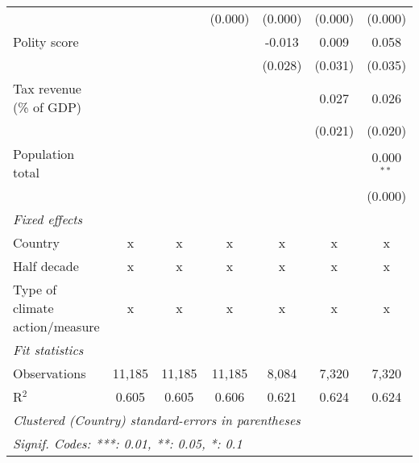 \begin{tabular}{lcccccc}
                                                                                                 &         &               & (0.000)        & (0.000)        & (0.000)        & (0.000)\\   
   Polity score                                                                                  &         &               &                & -0.013         & 0.009          & 0.058\\   
                                                                                                 &         &               &                & (0.028)        & (0.031)        & (0.035)\\   
   Tax revenue (\% of GDP)                                                                       &         &               &                &                & 0.027          & 0.026\\   
                                                                                                 &         &               &                &                & (0.021)        & (0.020)\\   
   Population total                                                                              &         &               &                &                &                & 0.000$^{**}$\\   
                                                                                                 &         &               &                &                &                & (0.000)\\   
   \emph{Fixed effects}\\
   Country                                                                                       & x       & x             & x              & x              & x              & x\\  
   Half decade                                                                                   & x       & x             & x              & x              & x              & x\\  
   Type of climate action/measure                                                                & x       & x             & x              & x              & x              & x\\  
   \midrule \emph{Fit statistics}\\
   Observations                                                                                  & 11,185  & 11,185        & 11,185         & 8,084          & 7,320          & 7,320\\  
   R$^2$                                                                                         & 0.605   & 0.605         & 0.606          & 0.621          & 0.624          & 0.624\\  
   \midrule
   \multicolumn{7}{l}{\emph{Clustered (Country) standard-errors in parentheses}}\\
   \multicolumn{7}{l}{\emph{Signif. Codes: ***: 0.01, **: 0.05, *: 0.1}}\\
\end{tabular}
\par\endgroup


